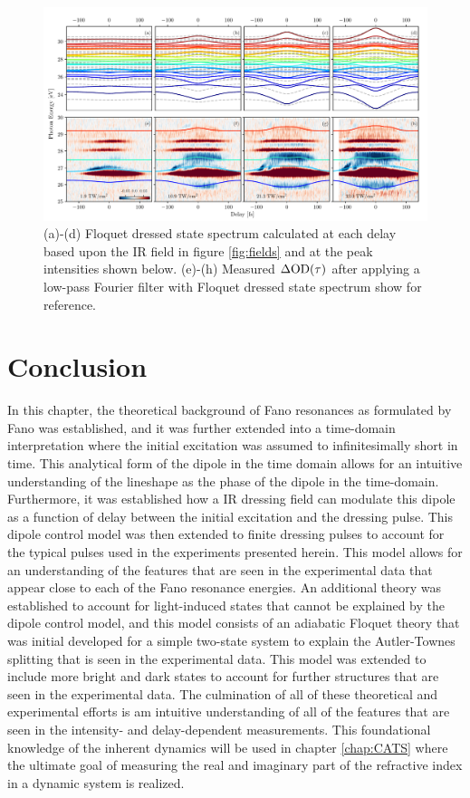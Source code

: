\begin{figure}%
	\includegraphics[width=\textwidth]{figures/ATS/dOD_floquet_spectrograms.pdf}
	\caption[Comparing Floquet dressed states to measured $\dod(\tau)$]{(a)-(d) Floquet dressed state spectrum calculated at each delay based upon the IR field in figure \ref{fig:fields} and at the peak intensities shown below.  (e)-(h) Measured $\dod(\tau)$ after applying a low-pass Fourier filter with Floquet dressed state spectrum show for reference.}
	\label{fig:dod_floquet_spectrograms}
\end{figure}

\section{Conclusion}
\label{sec:ATS_conclusion}

In this chapter, the theoretical background of Fano resonances as formulated by Fano was established, and it was further extended into a time-domain interpretation where the initial excitation was assumed to infinitesimally short in time.  This analytical form of the dipole in the time domain allows for an intuitive understanding of the lineshape as the phase of the dipole in the time-domain.  Furthermore, it was established how a IR dressing field can modulate this dipole as a function of delay between the initial excitation and the dressing pulse.  This dipole control model was then extended to finite dressing pulses to account for the typical pulses used in the experiments presented herein.  This model allows for an understanding of the features that are seen in the experimental data that appear close to each of the Fano resonance energies.  An additional theory was established to account for light-induced states that cannot be explained by the dipole control model, and this model consists of an adiabatic Floquet theory that was initial developed for a simple two-state system to explain the Autler-Townes splitting that is seen in the experimental data.  This model was extended to include more bright and dark states to account for further structures that are seen in the experimental data.  The culmination of all of these theoretical and experimental efforts is am intuitive understanding of all of the features that are seen in the intensity- and delay-dependent measurements.  This foundational knowledge of the inherent dynamics will be used in chapter \ref{chap:CATS} where the ultimate goal of measuring the real and imaginary part of the refractive index in a dynamic system is realized.


